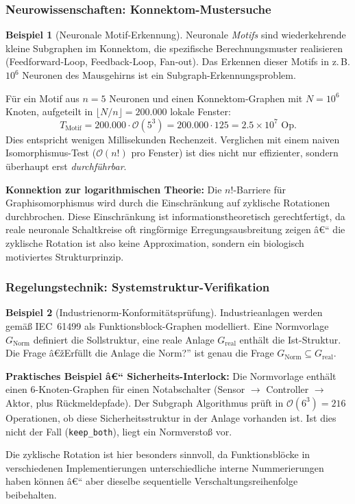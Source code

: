 ﻿\documentclass[12pt,a4paper,twoside]{article}
\theoremstyle{definition}
\newtheorem{beispiel}{Beispiel}[section]
\theoremstyle{plain}
\theoremstyle{remark}
\begin{document}
\subsubsection{Neurowissenschaften: Konnektom-Mustersuche}

\begin{beispiel}[Neuronale Motif-Erkennung]
Neuronale \emph{Motifs} sind wiederkehrende kleine
Subgraphen im Konnektom, die spezifische Berechnungsmuster
realisieren (Feedforward-Loop, Feedback-Loop, Fan-out).
Das Erkennen dieser Motifs in z.\,B. $10^6$ Neuronen
des Mausgehirns ist ein Subgraph-Erkennungsproblem.

Für ein Motif aus $n = 5$ Neuronen und einen
Konnektom-Graphen mit $N = 10^6$ Knoten, aufgeteilt
in $\lfloor N/n \rfloor = 200.000$ lokale Fenster:
\[
  T_{\text{Motif}} = 200.000 \cdot \mathcal{O}(5^3)
                   = 200.000 \cdot 125
                   = 2.5 \times 10^7 \text{ Op.}
\]
Dies entspricht wenigen Millisekunden Rechenzeit.
Verglichen mit einem naiven Isomorphis\-mus-Test
($\mathcal{O}(n!)$ pro Fenster) ist dies nicht
nur effizienter, sondern überhaupt erst \emph{durchführbar}.

\textbf{Konnektion zur logarithmischen Theorie:}
Die $n!$-Barriere für Graphisomorphismus wird durch die
Einschränkung auf zyklische Rotationen durchbrochen.
Diese Einschränkung ist informationstheoretisch gerechtfertigt,
da reale neuronale Schaltkreise oft ringförmige
Erregungsausbreitung zeigen â€“ die zyklische Rotation
ist also keine Approximation, sondern ein biologisch
motiviertes Strukturprinzip.
\end{beispiel}

\subsubsection{Regelungstechnik: Systemstruktur-Verifikation}

\begin{beispiel}[Industrienorm-Konformitätsprüfung]
Industrieanlagen werden gemäß IEC~61499 als Funktionsblock-Graphen
modelliert.  Eine Normvorlage $G_{\text{Norm}}$ definiert die
Sollstruktur, eine reale Anlage $G_{\text{real}}$ enthält
die Ist-Struktur.  Die Frage â€žErfüllt die Anlage die Norm?''
ist genau die Frage $G_{\text{Norm}} \subseteq G_{\text{real}}$.

\textbf{Praktisches Beispiel â€“ Sicherheits-Interlock:}
Die Normvorlage enthält einen 6-Knoten-Graphen für einen
Notabschalter (Sensor $\to$ Controller $\to$ Aktor,
plus Rückmeldepfade).  Der Subgraph Algorithmus prüft
in $\mathcal{O}(6^3) = 216$ Operationen, ob diese
Sicherheitsstruktur in der Anlage vorhanden ist.
Ist dies nicht der Fall (\texttt{keep\_both}),
liegt ein Normverstoß vor.

Die zyklische Rotation ist hier besonders sinnvoll,
da Funktionsblöcke in verschiedenen Implementierungen
unterschiedliche interne Nummerierungen haben können â€“
aber dieselbe sequentielle Verschaltungsreihenfolge
beibehalten.
\end{beispiel}
\end{document}
